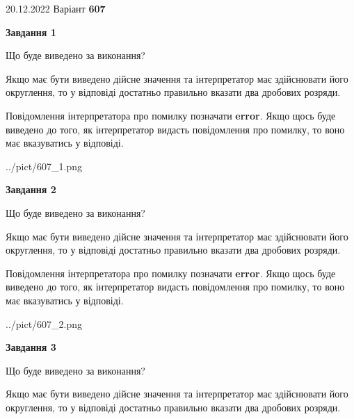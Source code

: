 \documentclass[12pt, ukrainian]{article}
\begin{document}
{20.12.2022 Варіант \No \textbf { 607 }\par}
{
\begin {Large}

{\begin {center}\textbf{Завдання 1}\end {center}}\par
Що буде виведено за виконання? \par

Якщо має бути виведено дійсне значення та інтерпретатор має здійснювати його округлення, 
то у відповіді достатньо правильно вказати два дробових розряди.

Повідомлення інтерпретатора про помилку позначати \textbf{error}.
Якщо щось буде виведено до того, як інтерпретатор видасть повідомлення про помилку, 
то воно має вказуватись у відповіді. \par

\begin{center}
	{../pict/607_1.png}
\end{center}
\newpage

{\begin {center}\textbf{Завдання 2}\end {center}}\par
Що буде виведено за виконання? \par

Якщо має бути виведено дійсне значення та інтерпретатор має здійснювати його округлення, 
то у відповіді достатньо правильно вказати два дробових розряди.

Повідомлення інтерпретатора про помилку позначати \textbf{error}.
Якщо щось буде виведено до того, як інтерпретатор видасть повідомлення про помилку, 
то воно має вказуватись у відповіді. \par

\begin{center}
	{../pict/607_2.png}
\end{center}
\newpage

{\begin {center}\textbf{Завдання 3}\end {center}}\par
Що буде виведено за виконання? \par

Якщо має бути виведено дійсне значення та інтерпретатор має здійснювати його округлення, 
то у відповіді достатньо правильно вказати два дробових розряди.


\end{Large}}
\end{document}
